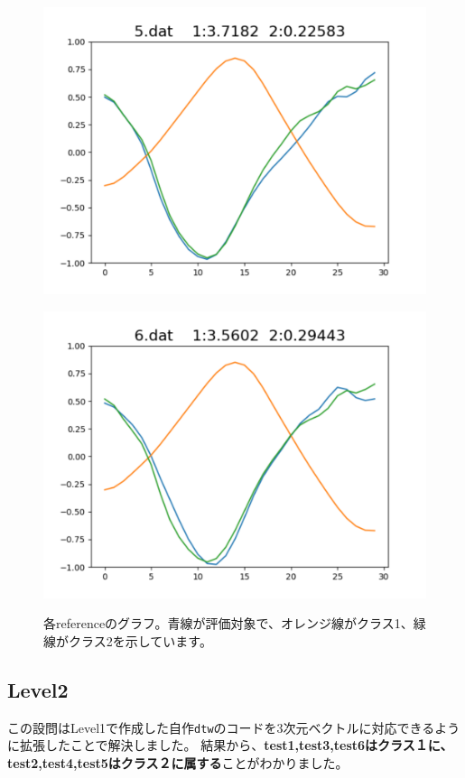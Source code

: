 \begin{figure}[h]
\begin{minipage}[b]{0.32\linewidth}
  \includegraphics[keepaspectratio, scale=0.3]
  {./pic/level1/5_dat.pdf}
  \label{5dat}
 \end{minipage}
  \begin{minipage}[b]{0.32\linewidth}
  \centering
  \includegraphics[keepaspectratio, scale=0.3]
  {./pic/level1/6_dat.pdf}
  \label{6dat}
 \end{minipage}
 \caption{各referenceのグラフ。青線が評価対象で、オレンジ線がクラス1、緑線がクラス2を示しています。}\label{reg_poly}
\end{figure}

\newpage

\subsection*{Level2}
この設問はLevel1で作成した自作\verb+dtw+のコードを3次元ベクトルに対応できるように拡張したことで解決しました。
結果から、\textbf{test1,test3,test6はクラス１に、test2,test4,test5はクラス２に属する}ことがわかりました。


